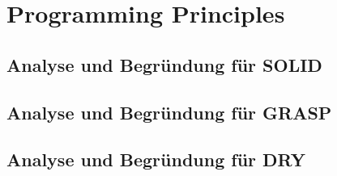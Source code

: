 \chapter{Programming Principles}
\section{Analyse und Begründung für SOLID}
\section{Analyse und Begründung für GRASP} %
\section{Analyse und Begründung für DRY}